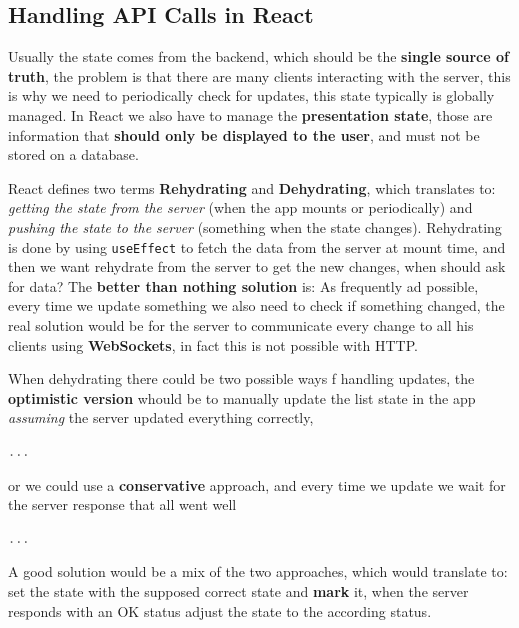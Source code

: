 \documentclass[12pt]{article}
\begin{document}
\subsection{Handling API Calls in React}
Usually the state comes from the backend, which should be the \textbf{single source of truth}, the problem is that there are many clients interacting with the server, this is why we need to periodically check for updates, this state typically is globally managed. In React we also have to manage the \textbf{presentation state}, those are information that \textbf{should only be displayed to the user}, and must not be stored on a database.

React defines two terms \textbf{Rehydrating} and \textbf{Dehydrating}, which translates to: \emph{getting the state from the server} (when the app mounts or periodically) and \emph{pushing the state to the server} (something when the state changes). Rehydrating is done by using \texttt{useEffect} to fetch the data from the server at mount time, and then we want rehydrate from the server to get the new changes, when should ask for data? The \textbf{better than nothing solution} is: As frequently ad possible, every time we update something we also need to check if something changed, the real solution would be for the server to communicate every change to all his clients using \textbf{WebSockets}, in fact this is not possible with HTTP.

When dehydrating there could be two possible ways f handling updates, the \textbf{optimistic version} whould be to manually update the list state in the app \emph{assuming} the server updated everything correctly,
\begin{lstlisting}[language=js]
...
\end{lstlisting}
or we could use a \textbf{conservative} approach, and every time we update we wait for the server response that all went well
\begin{lstlisting}[language=js]
...
\end{lstlisting}
A good solution would be a mix of the two approaches, which would translate to: set the state with the supposed correct state and \textbf{mark} it, when the server responds with an OK status adjust the state to the according status.
\end{document}
